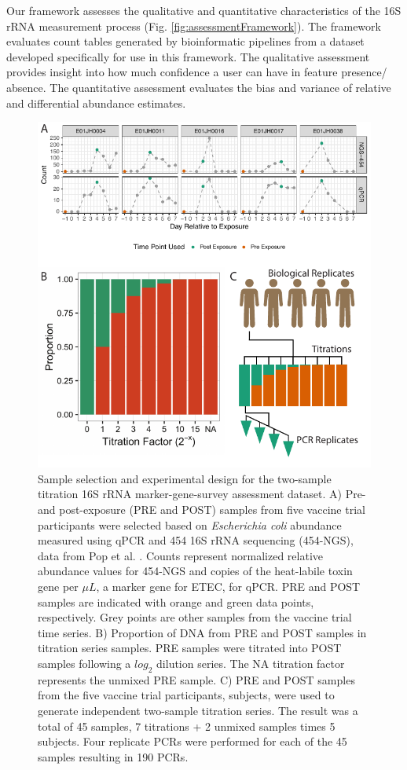 \documentclass{bmcart}
\begin{document}
Our framework assesses the qualitative and quantitative characteristics of the 16S rRNA measurement process (Fig. \ref{fig:assessmentFramework}).
The framework evaluates count tables generated by bioinformatic pipelines from a dataset developed specifically for use in this framework.
The qualitative assessment provides insight into how much confidence a user can have in feature  presence/ absence.
The quantitative assessment evaluates the bias and variance of relative and differential abundance estimates.

\begin{figure}
\centering
\includegraphics{experimentalDesign.pdf}
\caption{\label{fig:countExperimentalDesign}Sample selection and
experimental design for the two-sample titration 16S rRNA
marker-gene-survey assessment dataset. A) Pre- and post-exposure (PRE
and POST) samples from five vaccine trial participants were selected
based on \textit{Escherichia coli} abundance measured using qPCR and 454
16S rRNA sequencing (454-NGS), data from Pop et al. \cite{pop2016individual}.
Counts represent normalized relative abundance values for 454-NGS and
copies of the heat-labile toxin gene per \(\mu L\), a marker gene for
ETEC, for qPCR. PRE and POST samples are indicated with orange and green
data points, respectively. Grey points are other samples from the
vaccine trial time series. B) Proportion of DNA from PRE and POST
samples in titration series samples. PRE samples were titrated into POST
samples following a \(log_2\) dilution series. The NA titration factor
represents the unmixed PRE sample. C) PRE and POST samples from the five
vaccine trial participants, subjects, were used to generate independent
two-sample titration series. The result was a total of 45 samples, 7
titrations + 2 unmixed samples times 5 subjects. Four replicate PCRs
were performed for each of the 45 samples resulting in 190 PCRs.}
\end{figure}
\end{document}
